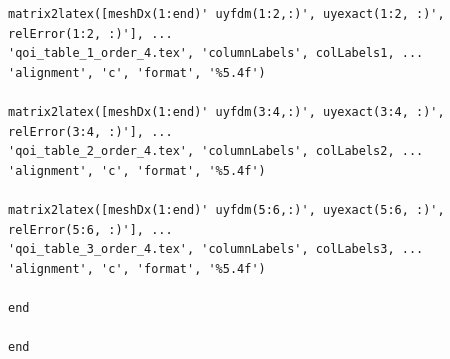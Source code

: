 \documentclass[10pt]{article}		%
\numberwithin{equation}{section}
\begin{document}
\begin{lstlisting}
matrix2latex([meshDx(1:end)' uyfdm(1:2,:)', uyexact(1:2, :)', relError(1:2, :)'], ...
'qoi_table_1_order_4.tex', 'columnLabels', colLabels1, ...
'alignment', 'c', 'format', '%5.4f')

matrix2latex([meshDx(1:end)' uyfdm(3:4,:)', uyexact(3:4, :)', relError(3:4, :)'], ...
'qoi_table_2_order_4.tex', 'columnLabels', colLabels2, ...
'alignment', 'c', 'format', '%5.4f')

matrix2latex([meshDx(1:end)' uyfdm(5:6,:)', uyexact(5:6, :)', relError(5:6, :)'], ...
'qoi_table_3_order_4.tex', 'columnLabels', colLabels3, ...
'alignment', 'c', 'format', '%5.4f')

end

end
\end{lstlisting}
\end{document}
